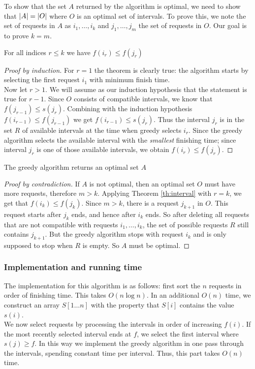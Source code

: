 \documentclass[]{article}
\begin{document}
			To show that the set $A$ returned by the algorithm is optimal, we need to show that $\lvert A \rvert = \lvert O \rvert$ where $O$ is an optimal set of intervals. To prove this, we note the set of requests in $A$ as $i_1,\dots,i_k$ and $j_1,\dots,j_m$ the set of requests in $O$. Our goal is to prove $k = m$. 
			\begin{theorem} \label{th:interval} For all indices $r \le k$ we have $f(i_r) \le f(j_r)$ \end{theorem}
			\begin{proof}[Proof by induction]
				For $r = 1$ the theorem is clearly true: the algorithm starts by selecting the first request $i_1$ with minimum finish time. \\
				Now let $r > 1$. We will assume as our induction hypothesis that the statement is true for $r - 1$. Since $O$ consists of compatible intervals, we know that $f(j_{r-1}) \le s(j_r)$. Combining with the induction hypothesis $f(i_{r-1}) \le f(j_{r-1})$ we get $f(i_{r-1}) \le s(j_r)$. Thus the interval $j_r$ is in the set $R$ of available intervals at the time when greedy selects $i_r$. Since the greedy algorithm selects the available interval with the \emph{smallest} finishing time; since interval $j_r$ is one of those available intervals, we obtain $f(i_r) \le f(j_r)$.
			\end{proof}
			\begin{theorem} The greedy algorithm returns an optimal set $A$ \end{theorem}
			\begin{proof}[Proof by contradiction]
				If $A$ is not optimal, then an optimal set $O$ must have more requests, therefore $m > k$. Applying Theorem \ref{th:interval} with $r = k$, we get that $f(i_k) \le f(j_k)$. Since $m > k$, there is a request $j_{k+1}$ in $O$. This request starts after $j_k$ ends, and hence after $i_k$ ends. So after deleting all requests that are not compatible with requests $i_1, \dots, i_k$, the set of possible requests $R$ still contains $j_{k+1}$. But the greedy algorithm stops with request $i_k$ and is only supposed to stop when $R$ is empty. So $A$ must be optimal. 
			\end{proof}
		\subsubsection{Implementation and running time}
			The implementation for this algorithm is as follows: first sort the $n$ requests in order of finishing time. This takes $O(n \log n)$. In an additional $O(n)$ time, we construct an array $S\left[1 \dots n\right]$ with the property that $S[i]$ contains the value $s(i)$. \\
			We now select requests by processing the intervals in order of increasing $f(i)$. If the most recently selected interval ends at $f$, we select the first interval where $s(j) \ge f$. In this way we implement the greedy algorithm in one pass through the intervals, spending constant time per interval. Thus, this part takes $O(n)$ time. 
\end{document}

